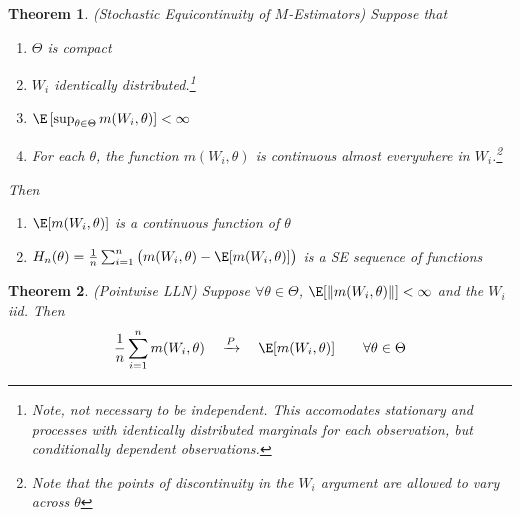 \documentclass[12pt]{article}
\theoremstyle{plain}
\newtheorem{thm}{Theorem}[section]
\theoremstyle{definition}
\theoremstyle{remark}
\newcommand{\pto}{\xrightarrow{P}}
\newcommand{\sumin}{\sum^n_{i=1}}
\begin{document}
\begin{thm}\emph{(Stochastic Equicontinuity of $M$-Estimators)}
Suppose that
\begin{enumerate}[label=\emph{(\roman*)}]
  \item $\Theta$ is compact
  \item $W_i$ identically distributed.\footnote{%
      Note, \emph{not} necessary to be \emph{independent}.
      This accomodates stationary and processes with identically
      distributed marginals for each observation, but conditionally
      dependent observations.
    }
  \item $\E\left[\sup_{\theta\in\Theta} m(W_i,\theta)\right]<\infty$
  \item For each $\theta$, the function $m(W_i,\theta)$ is continuous
    almost everywhere in $W_i$.\footnote{%
      Note that the points of discontinuity in the $W_i$ argument are
      allowed to vary across $\theta$
    }
\end{enumerate}
Then
\begin{enumerate}[label=\emph(\alph*)]
  \item $\E[m(W_i,\theta)]$ is a continuous function of $\theta$
  \item
    $H_n(\theta)=\frac{1}{n}\sumin\big(m(W_i,\theta)-\E[m(W_i,\theta)]\big)$
    is a SE sequence of functions
\end{enumerate}
\end{thm}


\clearpage
\begin{thm}\emph{(Pointwise LLN)}
Suppose $\forall\theta\in\Theta$,
$\E[\lVert m(W_i,\theta)\rVert]<\infty$ and the $W_i$ iid.
Then
\begin{align*}
  \frac{1}{n}
  \sumin m(W_i,\theta)
  \quad\pto\quad
  \E[m(W_i,\theta)]
  \qquad
  \forall \theta\in\Theta
\end{align*}
\end{thm}
\end{document}
